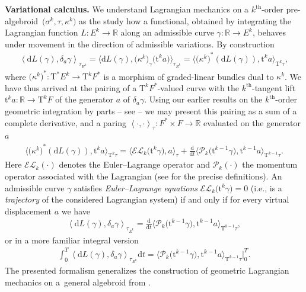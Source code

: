\documentclass[10pt,a4paper]{amsart}
\newcommand{\thh}[1]{#1^{\mathrm{th}}} %
\newcommand{\R}{\mathbb{R}}
\newcommand{\dd}{\mathrm{d}}
\newcommand{\ra}{\rightarrow}
\newcommand{\del}{\delta}
\newcommand{\prealg}{pre-algebroid} %
\newcommand{\TT}[1]{\mathrm{T}^{#1}} %
\newcommand{\tclass}[2]{\bm{\mathrm{t}}^{#1}#2} %
\newcommand{\dbydt}{\frac{\mathrm{d}}{\mathrm{d}t}}
\def\<#1>{\left\langle #1\right\rangle}
\numberwithin{equation}{section}
\theoremstyle{definition}
\begin{document}
{\bf Variational calculus.} We understand Lagrangian mechanics on a $\thh{k}$-order \prealg\ $\big(\sigma^k,\tau, \kappa^k\big)$ as the study how a functional, obtained by integrating the Lagrangian function $L\colon E^k\ra \R$ along an admissible curve $\gamma\colon \R\ra E^k$, behaves under movement in the direction of admissible variations. By construction
\begin{gather}\label{eqn:var_formula_0}
\<\dd L(\gamma),\del_a\gamma>_{\tau_{E^k}}=\big\langle \dd L(\gamma),\big(\kappa^k\big)_{\gamma}\big(\tclass{k}{a}\big)\big\rangle_{\tau_{E^k}}=\big\langle { \big(\kappa^k\big)}^\ast(\dd L(\gamma)), \tclass{k}{a}\big\rangle_{\TT{k}\tau},
\end{gather}
where ${\big(\kappa^k\big)}^\ast\colon \TT\ast E^k\ra \TT{k} F^\ast$ is a morphism of graded-linear bundles dual to $ \kappa^k$. We have thus arrived at the pairing of a $\TT{k} F^\ast$-valued curve with the $\thh{k}$-tangent lift $\tclass{k}{a}\colon \R\ra\TT{k} F$ of the generator $a$ of $\del_a\gamma$. Using our earlier results on the $\thh{k}$-order geometric integration by parts -- see \cite{MJ_MR_higher_var_calc_2013} -- we may present this pairing as a sum of a complete derivative, and a paring $\<\cdot,\cdot>_{\tau}\colon F^\ast\times F\ra \R$ evaluated on the generator $a$
\begin{gather}\label{eqn:var_formula}\big\langle {\big(\kappa^k\big)}^\ast(\dd L(\gamma)), \tclass{k}{a}\big\rangle_{\TT{k}\tau}=\big\langle \mathcal{EL}_k\big(\tclass{k}{\gamma}\big),a\big\rangle_{\tau}+\dbydt{\big\langle \mathcal{P}_k\big( \tclass{k-1}{\gamma}\big),\tclass{k-1}a\big\rangle_{\TT{k-1}\tau}}.
\end{gather}
 Here $\mathcal{EL}_k(\cdot)$ denotes the Euler--Lagrange operator and $\mathcal{P}_k(\cdot)$ the momentum operator associated with the Lagrangian (see \cite{MJ_MR_higher_var_calc_2013} for the precise definitions). An admissible curve $\gamma$ satisfies \emph{Euler--Lagrange equations} \mbox{$\mathcal{EL}_k\big( \tclass k {\gamma}\big)=0$} (i.e., is a \emph{trajectory} of the considered Lagrangian system) if and only if for every virtual displacement $a$ we have
\begin{gather}\label{eqn:var_calc}
\<\dd L(\gamma),\del_a\gamma>_{\tau_{E^k}}=\dbydt{\big\langle \mathcal{P}_k\big( \tclass{k-1}{\gamma}\big), \tclass{k-1}a\big\rangle_{\TT{k-1}\tau}},
\end{gather}
or in a more familiar integral version
\begin{gather*}\int_0^T\<\dd L(\gamma),\del_a\gamma>_{\tau_{E^k}}\dd t=\big\langle\mathcal{P}_k\big( \tclass{k-1}{\gamma}\big) ,\tclass{k-1}a\big\rangle_{\TT{k-1}\tau}\big|^T_0.\end{gather*}
The presented formalism generalizes the construction of geometric Lagrangian mechanics on a~general algebroid from \cite{GG_var_calc_gen_alg_2008}.
\end{document}
